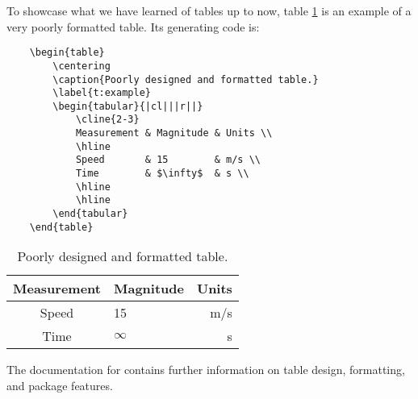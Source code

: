 To showcase what we have learned of tables up to now, table
\ref{t:example} is an example of a very poorly formatted table.  Its
generating code is:
\begin{verbatim}
	\begin{table}
	    \centering
	    \caption{Poorly designed and formatted table.}
	    \label{t:example}
	    \begin{tabular}{|cl|||r||}
	        \cline{2-3}
	        Measurement & Magnitude & Units \\
	        \hline
	        Speed		& 15		& m/s \\
	        Time		& $\infty$	& s \\
	        \hline
	        \hline
	    \end{tabular}
	\end{table}
\end{verbatim}
\begin{table}[!htbp]
    \centering
    \caption{Poorly designed and formatted table.}
    \label{t:example}
    \begin{tabular}{|cl|||r||}
        \cline{2-3}
        Measurement & Magnitude & Units \\
        \hline
        Speed		& 15		& m/s \\
        Time		& $\infty$	& s \\
        \hline
        \hline
    \end{tabular}
\end{table}

The documentation for  contains further information on
table design, formatting, and package features.
%
